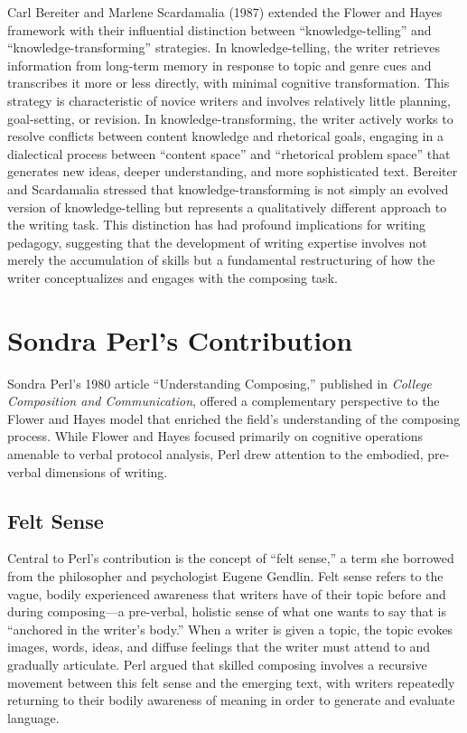 \documentclass[12pt]{article}
\begin{document}
Carl Bereiter and Marlene Scardamalia (1987) extended the Flower and Hayes framework with their influential distinction between ``knowledge-telling'' and ``knowledge-transforming'' strategies. In knowledge-telling, the writer retrieves information from long-term memory in response to topic and genre cues and transcribes it more or less directly, with minimal cognitive transformation. This strategy is characteristic of novice writers and involves relatively little planning, goal-setting, or revision. In knowledge-transforming, the writer actively works to resolve conflicts between content knowledge and rhetorical goals, engaging in a dialectical process between ``content space'' and ``rhetorical problem space'' that generates new ideas, deeper understanding, and more sophisticated text. Bereiter and Scardamalia stressed that knowledge-transforming is not simply an evolved version of knowledge-telling but represents a qualitatively different approach to the writing task. This distinction has had profound implications for writing pedagogy, suggesting that the development of writing expertise involves not merely the accumulation of skills but a fundamental restructuring of how the writer conceptualizes and engages with the composing task.

\section{Sondra Perl's Contribution}

Sondra Perl's 1980 article ``Understanding Composing,'' published in \textit{College Composition and Communication}, offered a complementary perspective to the Flower and Hayes model that enriched the field's understanding of the composing process. While Flower and Hayes focused primarily on cognitive operations amenable to verbal protocol analysis, Perl drew attention to the embodied, pre-verbal dimensions of writing.

\subsection{Felt Sense}

Central to Perl's contribution is the concept of ``felt sense,'' a term she borrowed from the philosopher and psychologist Eugene Gendlin. Felt sense refers to the vague, bodily experienced awareness that writers have of their topic before and during composing---a pre-verbal, holistic sense of what one wants to say that is ``anchored in the writer's body.'' When a writer is given a topic, the topic evokes images, words, ideas, and diffuse feelings that the writer must attend to and gradually articulate. Perl argued that skilled composing involves a recursive movement between this felt sense and the emerging text, with writers repeatedly returning to their bodily awareness of meaning in order to generate and evaluate language.
\end{document}
